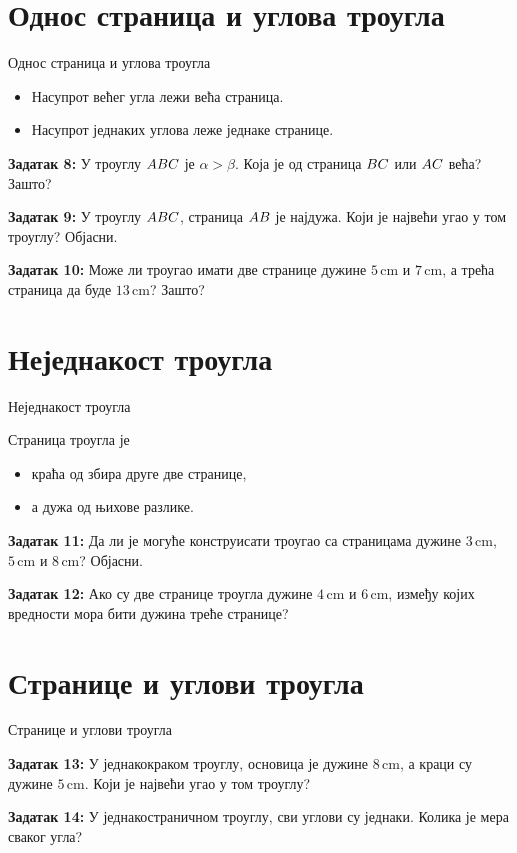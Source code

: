 \documentclass[12pt]{beamer}
\begin{document}
\section{Однос страница и углова троугла}
\begin{frame}{Однос страница и углова троугла}

\begin{itemize}
    \item Насупрот већег угла лежи већа страница.
    \item Насупрот једнаких углова леже једнаке странице.
\end{itemize}

\textbf{Задатак 8:}
У троуглу $\mathnormal{ABC}$ је $\alpha > \beta$.
Која је од страница
$\mathnormal{BC}$ или $\mathnormal{AC}$ већа? Зашто?

\textbf{Задатак 9:}
У троуглу $\mathnormal{ABC}$, страница $\mathnormal{AB}$ је најдужа.
Који је највећи угао у том троуглу? Објасни.

\textbf{Задатак 10:}
Може ли троугао имати две странице дужине
$5 \,\mathrm{cm}$ и $7 \,\mathrm{cm}$,
а трећа страница да буде $13 \,\mathrm{cm}$? Зашто?

\end{frame}


\section{Неједнакост троугла}
\begin{frame}{Неједнакост троугла}

Страница троугла је
\begin{itemize}
    \item краћа од збира друге две странице,
    \item а дужа од њихове разлике.
\end{itemize}

\textbf{Задатак 11:}
Да ли је могуће конструисати троугао са страницама дужине
$3 \,\mathrm{cm}$, $5 \,\mathrm{cm}$ и $8 \,\mathrm{cm}$? Објасни.

\textbf{Задатак 12:}
Ако су две странице троугла дужине
$4 \,\mathrm{cm}$ и $6 \,\mathrm{cm}$,
између којих вредности мора бити дужина треће странице?

\end{frame}

\section{Странице и углови троугла}
\begin{frame}{Странице и углови троугла}

\textbf{Задатак 13:}
У једнакокраком троуглу, основица је дужине
$8 \,\mathrm{cm}$, а краци су дужине $5 \,\mathrm{cm}$.
Који је највећи угао у том троуглу?

\textbf{Задатак 14:}
У једнакостраничном троуглу, сви углови су једнаки. Колика је мера сваког угла?

\end{frame}
\end{document}
